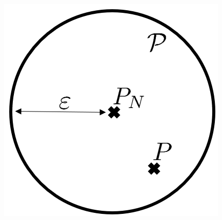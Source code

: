 \documentclass[student, noshadow, itr, english, aspectratio=169]{ITR_LSR_slides}
\begin{document}
\begin{frame}
\begin{columns}[onlytextwidth, T]
\begin{column}{.65\textwidth}
\end{column}
\begin{column}{.3\textwidth}
\vspace{.5cm}
\includegraphics[width= \textwidth]{AmbiguitySetDrawing}
\end{column}
\end{columns}

\end{frame}
\end{document}
